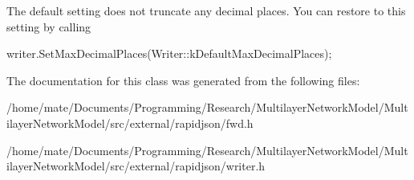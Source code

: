 The default setting does not truncate any decimal places. You can restore to this setting by calling 
\begin{DoxyCode}
writer.SetMaxDecimalPlaces(Writer::kDefaultMaxDecimalPlaces);
\end{DoxyCode}
 

The documentation for this class was generated from the following files\+:\begin{DoxyCompactItemize}
\item 
/home/mate/\+Documents/\+Programming/\+Research/\+Multilayer\+Network\+Model/\+Multilayer\+Network\+Model/src/external/rapidjson/fwd.\+h\item 
/home/mate/\+Documents/\+Programming/\+Research/\+Multilayer\+Network\+Model/\+Multilayer\+Network\+Model/src/external/rapidjson/writer.\+h\end{DoxyCompactItemize}
